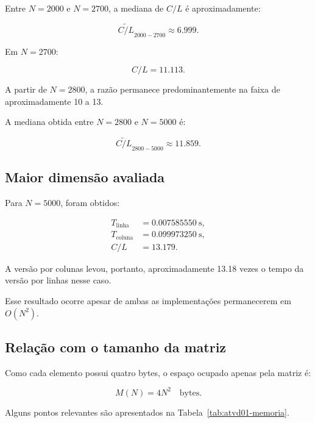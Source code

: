Entre \(N=2000\) e \(N=2700\), a mediana de \(C/L\) é aproximadamente:

\begin{equation}
    \widetilde{C/L}_{2000-2700}
    \approx
    6.999.
\end{equation}

Em \(N=2700\):

\begin{equation}
    C/L = 11.113.
\end{equation}

A partir de \(N=2800\), a razão permanece predominantemente na faixa de
aproximadamente 10 a 13.

A mediana obtida entre \(N=2800\) e \(N=5000\) é:

\begin{equation}
    \widetilde{C/L}_{2800-5000}
    \approx
    11.859.
\end{equation}


\subsection{Maior dimensão avaliada}

Para \(N=5000\), foram obtidos:

\begin{align}
T_{\mathrm{linha}}
&=
0.007585550\ \mathrm{s},
\\
T_{\mathrm{coluna}}
&=
0.099973250\ \mathrm{s},
\\
C/L
&=
13.179.
\end{align}

A versão por colunas levou, portanto, aproximadamente 13.18 vezes o tempo
da versão por linhas nesse caso.

Esse resultado ocorre apesar de ambas as implementações permanecerem em
\(O(N^2)\).


\subsection{Relação com o tamanho da matriz}

Como cada elemento possui quatro bytes, o espaço ocupado apenas pela
matriz é:

\begin{equation}
    M(N)
    =
    4N^2
    \quad\text{bytes}.
    \label{eq:atvd01-memoria}
\end{equation}

Alguns pontos relevantes são apresentados na
Tabela~\ref{tab:atvd01-memoria}.

